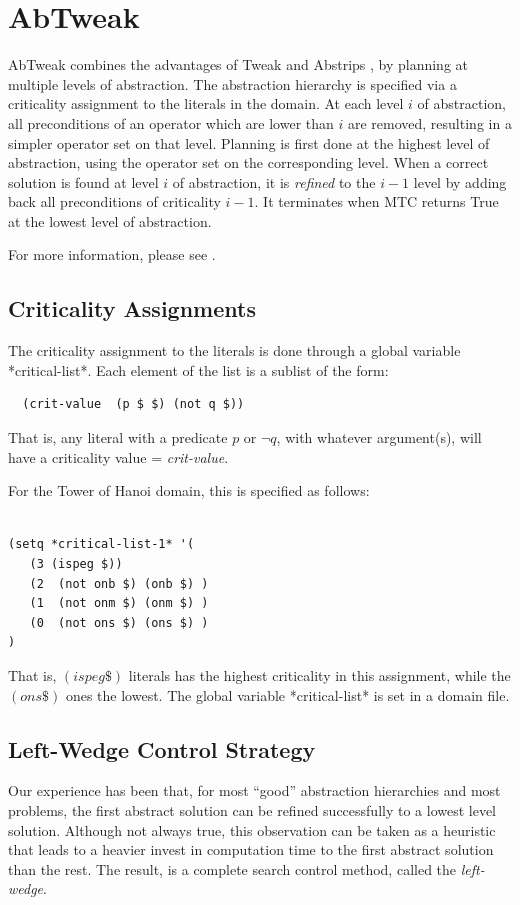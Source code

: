 \section{AbTweak}
AbTweak combines the advantages of Tweak and Abstrips
\cite{abstrips}, by planning at multiple levels of abstraction.  The
abstraction hierarchy is specified via a criticality assignment to the
literals in the domain.  At each level $i$ of abstraction, all
preconditions of an operator which are lower than $i$ are removed,
resulting in a simpler operator set on that level.  Planning is first
done at the highest level of abstraction, using the operator set on
the corresponding level.  When a correct solution is found at level
$i$ of abstraction, it is {\em refined} to the $i-1$ level by adding
back all preconditions of criticality $i-1$.  It terminates when MTC
returns True at the lowest level of abstraction.

For more information, please see \cite{abtweak}.

\subsection{Criticality Assignments}
The criticality assignment to the literals is done through a global
variable *critical-list*.  Each element of the list is a sublist of
the form:
\begin{verbatim}
  (crit-value  (p $ $) (not q $))
\end{verbatim}
That is, any literal with a predicate $p$ or $\neg q$, with whatever
argument(s), will have a criticality value = {\em crit-value}.

For the Tower of Hanoi domain, this is specified as follows:
\begin{verbatim}

(setq *critical-list-1* '(
   (3 (ispeg $))
   (2  (not onb $) (onb $) )
   (1  (not onm $) (onm $) )
   (0  (not ons $) (ons $) )
)
\end{verbatim}
That is, $(ispeg \$)$ literals has the highest criticality in this
assignment, while the $(ons \$)$ ones the lowest.
The global variable *critical-list* is set in a domain file.

\subsection{Left-Wedge Control Strategy}
Our experience has been that, for most ``good'' abstraction
hierarchies and most problems, the first abstract solution can be
refined successfully to a lowest level solution.  Although not always
true, this observation can be taken as a heuristic that leads to a
heavier invest in computation time to the first abstract solution than
the rest.  The result, is a complete search control method, called the
{\em left-wedge}.

